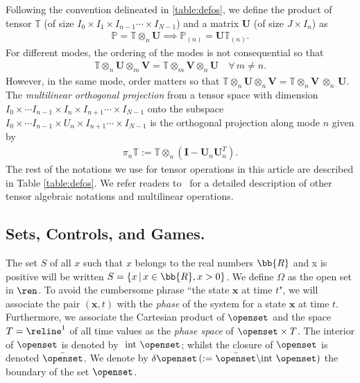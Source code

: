 Following the convention delineated in \autoref{table:defos}, we define the product of tensor $\mathds{T}$ (of size $I_0 \times I_1 \times I_{n-1} \cdots \times I_{N-1}$) and a matrix $\mathbf{U}$ (of size $J \times I_n$) as
%
\begin{align}
	\mathds{P} = \mathds{T} \otimes_n \mathbf{U} \implies \mathds{P}_{(n)} = \mathbf{U}  \mathds{T}_{(n)}.
	\label{eq:ttm}
\end{align}
%
For different modes, the ordering of the modes is not consequential so that 
%
\begin{align}
	\mathds{T} \otimes_n \mathbf{U} \otimes_m \mathbf{V} = \mathds{T} \otimes_m \mathbf{V} \otimes_n \mathbf{U} \quad \forall \, m \neq n.
\end{align}
%
However, in the same mode, order matters so that $\mathds{T} \otimes_n \mathbf{U} \otimes_n \mathbf{V} = \mathds{T} \otimes_n \mathbf{V} \, \otimes_n \, \mathbf{U}$. The \textit{multilinear orthogonal projection} from a tensor space with dimension ${I_0 \times \cdots I_{n-1}  \times I_n \times I_{n+1} \cdots \times I_{N-1}}$ onto the subspace ${I_0 \times \cdots I_{n-1}  \times U_n \times I_{n+1} \cdots \times I_{N-1}}$ is the orthogonal projection along mode $n$ given by
%
\begin{align}
	\pi_n \mathds{T} := \mathds{T}\otimes_n \left(\mathbf{I}-\mathbf{U}_n \mathbf{U}_n^T \right).
\end{align}
%
The rest of the notations we use for tensor operations in this article are described in Table \ref{table:defos}. We refer readers to~\cite{Kolda2009, VannieuwenhovenTruncate2012} for a detailed description of other tensor algebraic notations and multilinear operations. 

\subsection{Sets, Controls, and Games.}
%
\noindent The set $S$ of all $x$ such that $x$ belongs to the real numbers  $\bb{R}$ and x is positive will be written $S=\{x\,|\, x \in \bb{R}, x >0\}$. We define $\Omega$ as the open set in $\ren$.  To avoid the cumbersome phrase ``the state $\bm{x}$ at time $t$", we will associate the pair $(\bm{x}, t)$ with the \textit{phase} of the system for a state $\bm{x}$ at time $t$. Furthermore, we associate the Cartesian product of $\openset$ and the space $T =\reline^1$ of all time values as the \textit{phase space} of $\openset \times T$. The interior of $\openset$ is denoted by $\text{ int } \openset$; whilst the closure of $\openset$ is denoted $\bar{\openset}$. We denote by $\delta \openset \,(:= \bar{\openset} \backslash \text{int } \openset)$ the boundary of the set $\openset$. 

